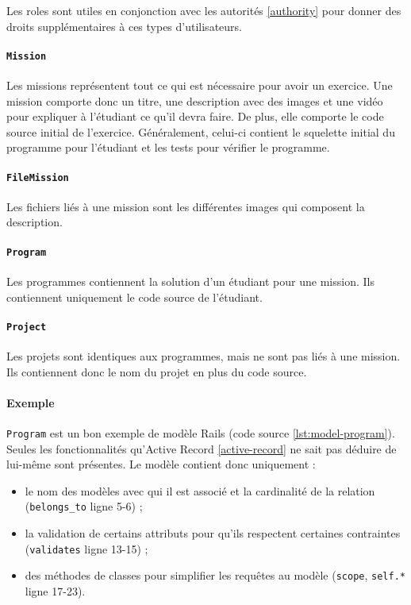 Les \glspl{role} sont utiles en conjonction avec les autorités \ref{authority} pour donner des droits supplémentaires à ces types d'utilisateurs.

\paragraph{\texttt{Mission}} Les \glspl{mission} représentent tout ce qui est nécessaire pour avoir un exercice. Une \gls{mission} comporte donc un titre, une description avec des images et une vidéo pour expliquer à l'étudiant ce qu'il devra faire. De plus, elle comporte le code source initial de l'exercice. Généralement, celui-ci contient le squelette initial du programme pour l'étudiant et les tests pour vérifier le programme. 

\paragraph{\texttt{FileMission}} Les fichiers liés à une \gls{mission} sont les différentes images qui composent la description. 

\paragraph{\texttt{Program}} Les programmes contiennent la solution d'un étudiant pour une \gls{mission}. Ils contiennent uniquement le code source de l'étudiant.

\paragraph{\texttt{Project}} Les projets sont identiques aux programmes, mais ne sont pas liés à une \gls{mission}. Ils contiennent donc le nom du projet en plus du code source.

\paragraph{Exemple} \texttt{Program} est un bon exemple de modèle Rails (code source \ref{lst:model-program}). Seules les fonctionnalités qu’Active Record \ref{active-record} ne sait pas déduire de lui-même sont présentes. Le modèle contient donc uniquement :
\begin{itemize}
  \item le nom des modèles avec qui il est associé et la cardinalité de la relation (\lstinline[language=Rails]{belongs_to} ligne 5-6) ;
  \item la validation de certains attributs pour qu'ils respectent certaines contraintes (\lstinline[language=Rails]{validates} ligne 13-15) ;
  \item des méthodes de classes pour simplifier les requêtes au modèle (\lstinline[language=Rails]{scope},  \lstinline[language=Rails]{self.*} ligne 17-23).
\end{itemize}

